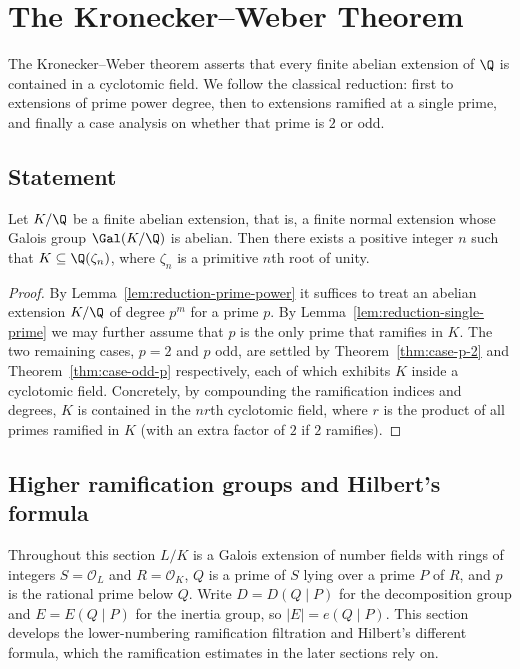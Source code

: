 \chapter{The Kronecker--Weber Theorem}

The Kronecker--Weber theorem asserts that every finite abelian extension of
$\Q$ is contained in a cyclotomic field. We follow the classical reduction:
first to extensions of prime power degree, then to extensions ramified at a
single prime, and finally a case analysis on whether that prime is $2$ or odd.

\section{Statement}

\begin{theorem}
  \label{thm:kronecker-weber}
  \leanok
  Let $K/\Q$ be a finite abelian extension, that is, a finite normal extension
  whose Galois group $\Gal(K/\Q)$ is abelian. Then there exists a positive
  integer $n$ such that $K \subseteq \Q(\zeta_n)$, where $\zeta_n$ is a
  primitive $n$th root of unity.
\end{theorem}
\begin{proof}
  By Lemma~\ref{lem:reduction-prime-power} it suffices to treat an abelian
  extension $K/\Q$ of degree $p^m$ for a prime $p$. By
  Lemma~\ref{lem:reduction-single-prime} we may further assume that $p$ is the
  only prime that ramifies in $K$. The two remaining cases, $p = 2$ and $p$
  odd, are settled by Theorem~\ref{thm:case-p-2} and
  Theorem~\ref{thm:case-odd-p} respectively, each of which exhibits $K$ inside
  a cyclotomic field. Concretely, by compounding the ramification indices and
  degrees, $K$ is contained in the $nr$th cyclotomic field, where $r$ is the
  product of all primes ramified in $K$ (with an extra factor of $2$ if $2$
  ramifies).
\end{proof}

\section{Higher ramification groups and Hilbert's formula}

Throughout this section $L/K$ is a Galois extension of number fields with rings
of integers $S = \mathcal{O}_L$ and $R = \mathcal{O}_K$, $Q$ is a prime of $S$
lying over a prime $P$ of $R$, and $p$ is the rational prime below $Q$. Write
$D = D(Q \mid P)$ for the decomposition group and $E = E(Q \mid P)$ for the
inertia group, so $|E| = e(Q \mid P)$. This section develops the lower-numbering
ramification filtration and Hilbert's different formula, which the ramification
estimates in the later sections rely on.

